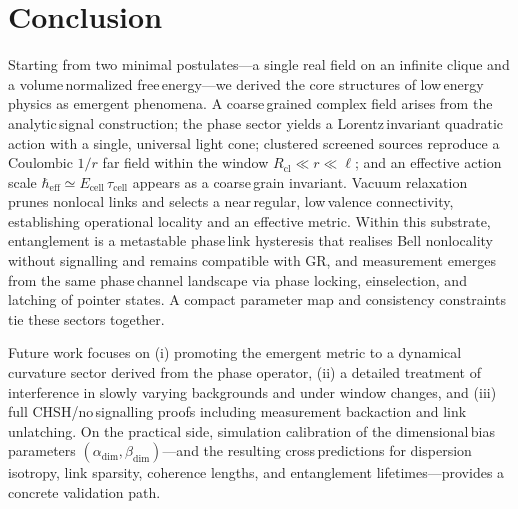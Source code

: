 \documentclass[11pt]{article}
\begin{document}
\section{Conclusion}

Starting from two minimal postulates—a single real field on an infinite clique and a volume\,normalized free\,energy—we derived the core structures of low\,energy physics as emergent phenomena. A coarse\,grained complex field arises from the analytic\,signal construction; the phase sector yields a Lorentz\,invariant quadratic action with a single, universal light cone; clustered screened sources reproduce a Coulombic $1/r$ far field within the window $R_{\mathrm{cl}}\ll r\ll \ell$; and an effective action scale $\hbar_{\mathrm{eff}}\simeq E_{\text{cell}}\,\tau_{\text{cell}}$ appears as a coarse\,grain invariant. Vacuum relaxation prunes nonlocal links and selects a near\,regular, low\,valence connectivity, establishing operational locality and an effective metric. Within this substrate, entanglement is a metastable phase\,link hysteresis that realises Bell nonlocality without signalling and remains compatible with GR, and measurement emerges from the same phase\,channel landscape via phase locking, einselection, and latching of pointer states. A compact parameter map and consistency constraints tie these sectors together.

Future work focuses on (i) promoting the emergent metric to a dynamical curvature sector derived from the phase operator, (ii) a detailed treatment of interference in slowly varying backgrounds and under window changes, and (iii) full CHSH/no\,signalling proofs including measurement backaction and link unlatching. On the practical side, simulation calibration of the dimensional\,bias parameters $(\alpha_{\mathrm{dim}},\beta_{\mathrm{dim}})$—and the resulting cross\,predictions for dispersion isotropy, link sparsity, coherence lengths, and entanglement lifetimes—provides a concrete validation path.
\end{document}
